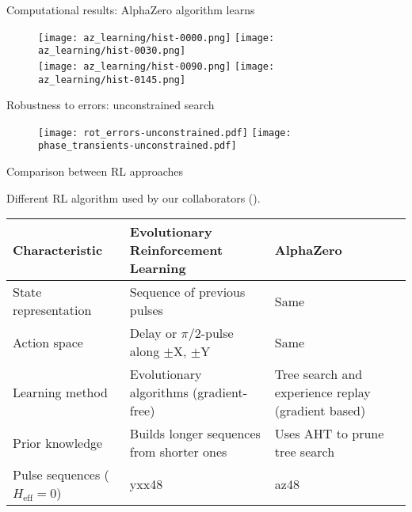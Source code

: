\documentclass{beamer}
\begin{document}
\begin{frame}{Computational results: AlphaZero algorithm learns}

\begin{figure}
\centering
\texttt{[image: az\_learning/hist-0000.png]}
\texttt{[image: az\_learning/hist-0030.png]} \\
\texttt{[image: az\_learning/hist-0090.png]}
\texttt{[image: az\_learning/hist-0145.png]}
\end{figure}

\end{frame}

\begin{frame}
{Robustness to errors: unconstrained search}

\begin{figure}
\centering
\texttt{[image: rot\_errors-unconstrained.pdf]}
\hfill
\texttt{[image: phase\_transients-unconstrained.pdf]}
\end{figure}

\end{frame}

\begin{frame}{Comparison between RL approaches}

Different RL algorithm used by our collaborators (\cite{peng2021deep}).

\begin{table}
\centering
\begin{footnotesize}
\begin{tabular}{p{}|p{}|p{}}
    Characteristic & Evolutionary Reinforcement Learning & AlphaZero \\
    \hline
    State representation & Sequence of previous pulses & Same \\
    \hline
    Action space & Delay or $\pi/2$-pulse along $\pm$X, $\pm$Y & Same \\
    \hline
    Learning method & Evolutionary algorithms (gradient-free) & Tree search and experience replay (gradient based) \\
    \hline
    Prior knowledge & Builds longer sequences from shorter ones & Uses AHT to prune tree search \\
    \hline
    Pulse sequences ($H_\text{eff} = 0$) & yxx48 & az48
\end{tabular}
\end{footnotesize}
\end{table}

\end{frame}
\end{document}
